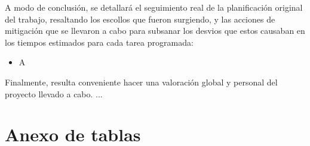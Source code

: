 \documentclass[IB,BIB]{TFUOC}%
\begin{document}
A modo de conclusión, se detallará el seguimiento real de la planificación original del trabajo, resaltando los escollos que fueron surgiendo, y las acciones de mitigación que se llevaron a cabo para subsanar los desvios que estos causaban en los tiempos estimados para cada tarea programada:

\begin{itemize}
\item A
\end{itemize}

Finalmente, resulta conveniente hacer una valoración global y personal del proyecto llevado a cabo. ...


\newpage


\scriptsize

\printglossaries


\newpage


\scriptsize




\newpage



\scriptsize
{}
\appendix


\chapter{Anexo de tablas}
\label{chap:Anexo de tablas}


\end{document}
